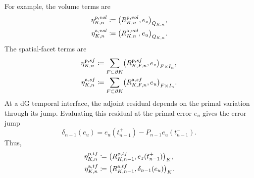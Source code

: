 
For example, the volume terms are
\begin{align}
  \eta_{K,n}^{\mathrm p,vol}
  &\coloneqq
  \bigl(R_{K,n}^{\mathrm p,vol},e_z\bigr)_{Q_{K,n}},
  \notag\\
  \eta_{K,n}^{\mathrm a,vol}
  &\coloneqq
  \bigl(R_{K,n}^{\mathrm a,vol},e_u\bigr)_{Q_{K,n}}.
  \label{eq:nonlinear-dwr-volume-components}
\end{align}
The spatial-facet terms are
\begin{align}
  \eta_{K,n}^{\mathrm p,sf}
  &\coloneqq
  \sum_{F\subset\partial K}
  \bigl(R_{K,F,n}^{\mathrm p,sf},e_z\bigr)_{F\times I_n},
  \notag\\
  \eta_{K,n}^{\mathrm a,sf}
  &\coloneqq
  \sum_{F\subset\partial K}
  \bigl(R_{K,F,n}^{\mathrm a,sf},e_u\bigr)_{F\times I_n}.
  \label{eq:nonlinear-dwr-spatial-components}
\end{align}
At a dG temporal interface, the adjoint residual depends on the primal variation through its jump. Evaluating this residual at the primal error \(e_u\) gives the error jump
\begin{equation}
  \delta_{n-1}(e_u)
  =
  e_u(t_{n-1}^{+})
  -
  P_{n-1}e_u(t_{n-1}^{-}).
  \label{eq:primal-error-incoming-defect}
\end{equation}
Thus,
\begin{align}
  \eta_{K,n}^{\mathrm p,tf}
  &\coloneqq
  \bigl(R_{K,n-1}^{\mathrm p,tf},e_z(t_{n-1}^+)\bigr)_K,
  \notag\\
  \eta_{K,n}^{\mathrm a,tf}
  &\coloneqq
  \bigl(R_{K,n-1}^{\mathrm a,tf},
        \delta_{n-1}(e_u)\bigr)_K.
  \label{eq:nonlinear-dwr-temporal-components}
\end{align}
